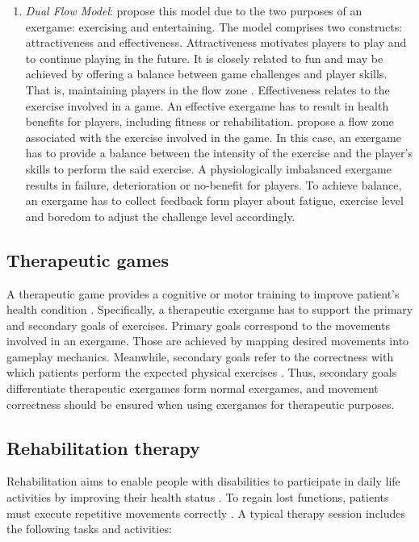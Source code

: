 \begin{enumerate}
    \item \emph{Dual Flow Model}: \textcite{Sinclair2007} propose this model due to the two purposes of an exergame: exercising and entertaining. The model comprises two constructs: attractiveness and effectiveness. Attractiveness motivates players to play and to continue playing in the future. It is closely related to fun and may be achieved by offering a balance between game challenges and player skills. That is, maintaining players in the flow zone \autocite{flow}.
    Effectiveness relates to the exercise involved in a game. An effective exergame has to result in health benefits for players, including fitness or rehabilitation. \citeauthor{Sinclair2007} propose a flow zone associated with the exercise involved in the game. In this case, an exergame has to provide a balance between the intensity of the exercise and the player's skills to perform the said exercise. A physiologically imbalanced exergame results in failure, deterioration or no-benefit for players. To achieve balance, an exergame has to collect feedback form player about fatigue, exercise level and boredom to adjust the challenge level accordingly.
\end{enumerate}

\subsection{Therapeutic games}
\label{sub:def_therapeutic_g}
A therapeutic game provides a cognitive or motor training to improve patient's health condition \autocite{Mader2012}. Specifically, a therapeutic exergame has to support the primary and secondary goals of exercises. Primary goals correspond to the movements involved in an exergame. Those are achieved by mapping desired movements into gameplay mechanics. Meanwhile, secondary goals refer to the correctness with which patients perform the expected physical exercises \autocite{Pirovano2016}. Thus, secondary goals differentiate therapeutic exergames form normal exergames, and movement correctness should be ensured when using exergames for therapeutic purposes.

\subsection{Rehabilitation therapy}
\label{sub:def_rehab_therapy}
Rehabilitation aims to enable people with disabilities to participate in daily life activities by improving their health status \autocite{Wiemeyer2015}. To regain lost functions, patients must execute repetitive movements correctly \autocite{PirovanoAdvisor2012}. A typical therapy session includes the following tasks and activities:

